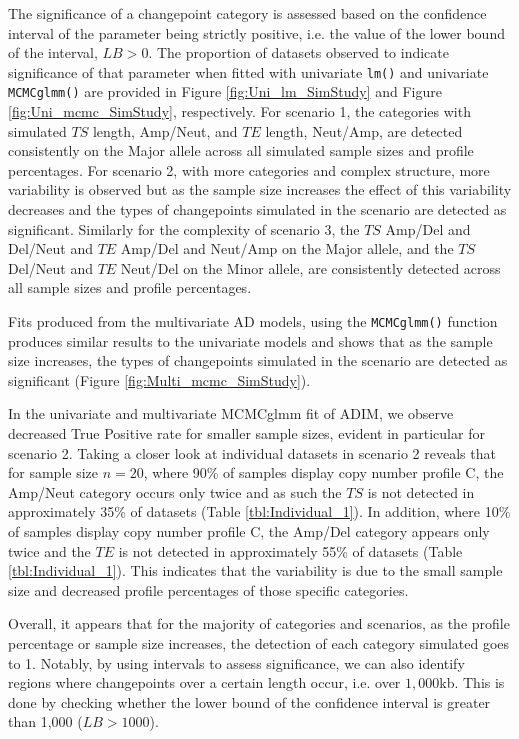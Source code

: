 The significance of a changepoint category is assessed based on the confidence interval of the parameter being strictly positive, i.e. the value of the lower bound of the interval, $LB > 0$. The proportion of datasets observed to indicate significance of that parameter when fitted with univariate \texttt{lm()} and univariate \texttt{MCMCglmm()} are provided in Figure \ref{fig:Uni_lm_SimStudy} and Figure \ref{fig:Uni_mcmc_SimStudy}, respectively. For scenario 1, the categories with simulated $TS$ length, Amp/Neut, and $TE$ length, Neut/Amp, are detected consistently on the Major allele across all simulated sample sizes and profile percentages. For scenario 2, with more categories and complex structure, more variability is observed but as the sample size increases the effect of this variability decreases and the types of changepoints simulated in the scenario are detected as significant. Similarly for the complexity of scenario 3, the $TS$ Amp/Del and Del/Neut and $TE$ Amp/Del and Neut/Amp on the Major allele, and the $TS$ Del/Neut and $TE$ Neut/Del on the Minor allele, are consistently detected across all sample sizes and profile percentages. 

Fits produced from the multivariate AD models, using the \texttt{MCMCglmm()} function produces similar results to the univariate models and shows that as the sample size increases, the types of changepoints simulated in the scenario are detected as significant (Figure \ref{fig:Multi_mcmc_SimStudy}).

In the univariate and multivariate MCMCglmm fit of ADIM, we observe decreased True Positive rate for smaller sample sizes, evident in particular for scenario 2. Taking a closer look at individual datasets in scenario 2 reveals that for sample size $n = 20$, where 90\% of samples display copy number profile C, the Amp/Neut category occurs only twice and as such the $TS$ is not detected in approximately 35\% of datasets (Table \ref{tbl:Individual_1}). In addition, where 10\% of samples display copy number profile C, the Amp/Del category appears only twice and the $TE$ is not detected in approximately 55\% of datasets (Table \ref{tbl:Individual_1}). This indicates that the variability is due to the small sample size and decreased profile percentages of those specific categories. 

Overall, it appears that for the majority of categories and scenarios, as the profile percentage or sample size increases, the detection of each category simulated goes to 1. Notably, by using intervals to assess significance, we can also identify regions where changepoints over a certain length occur, i.e. over $1,000$kb. This is done by checking whether the lower bound of the confidence interval is greater than 1,000 ($LB > 1000$).

